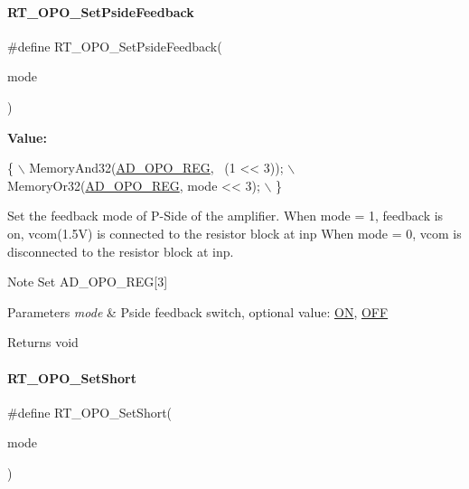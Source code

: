 \paragraph{\texorpdfstring{R\+T\+\_\+\+O\+P\+O\+\_\+\+Set\+Pside\+Feedback}{RT\_OPO\_SetPsideFeedback}}
{\footnotesize\ttfamily \#define R\+T\+\_\+\+O\+P\+O\+\_\+\+Set\+Pside\+Feedback(\begin{DoxyParamCaption}\item[{}]{mode }\end{DoxyParamCaption})}

{\bfseries Value\+:}
\begin{DoxyCode}
\{                                       \(\backslash\)
        MemoryAnd32(\mbox{\hyperlink{a00020_aeca2931f15b40d772a94a66e4641619e}{AD\_OPO\_REG}}, ~(1 << 3)); \(\backslash\)
        MemoryOr32(\mbox{\hyperlink{a00020_aeca2931f15b40d772a94a66e4641619e}{AD\_OPO\_REG}}, mode << 3);  \(\backslash\)
    \}
\end{DoxyCode}


Set the feedback mode of P-\/\+Side of the amplifier. When mode = 1, feedback is on, vcom(1.\+5V) is connected to the resistor block at inp When mode = 0, vcom is disconnected to the resistor block at inp. 

\begin{DoxyNote}{Note}
Set A\+D\+\_\+\+O\+P\+O\+\_\+\+R\+EG\mbox{[}3\mbox{]} 
\end{DoxyNote}

\begin{DoxyParams}{Parameters}
{\em mode} & Pside feedback switch, optional value\+: \mbox{\hyperlink{a00020_ad76d1750a6cdeebd506bfcd6752554d2}{ON}}, \mbox{\hyperlink{a00020_a29e413f6725b2ba32d165ffaa35b01e5}{O\+FF}} \\
\hline
\end{DoxyParams}
\begin{DoxyReturn}{Returns}
void 
\end{DoxyReturn}
\mbox{\label{a00002_aef61e41bd9fb19c3690ff5a25fb9893d}} 
\paragraph{\texorpdfstring{R\+T\+\_\+\+O\+P\+O\+\_\+\+Set\+Short}{RT\_OPO\_SetShort}}
{\footnotesize\ttfamily \#define R\+T\+\_\+\+O\+P\+O\+\_\+\+Set\+Short(\begin{DoxyParamCaption}\item[{}]{mode }\end{DoxyParamCaption})}

